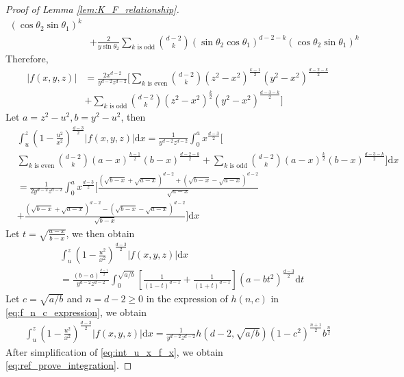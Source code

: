\documentclass[conference,a4paper]{IEEEtran}
\def\d{\mathrm{d}}
\begin{document}
\begin{proof}[Proof of Lemma \ref{lem:K_F_relationship}]
\begin{align*}
(\cos\theta_2 \sin\theta_1)^k \\
&+\frac{2}{y\sin\theta_2} \sum_{k \textrm{ is odd}}
\binom{d-2}{k} (\sin\theta_2\cos\theta_1)^{d-2-k}
(\cos\theta_2 \sin\theta_1)^k
\end{align*}
Therefore,
\begin{align*}
|f(x,y,z)|
&= \frac{2x^{d-2}}{y^{d-2}z^{d-2}}
\Big[
     \sum_{k \textrm{ is even}}
     \binom{d-2}{k} (z^2-x^2)^{\frac{k-1}{2}}
     (y^2-x^2)^{\frac{d-2-k}{2}}\\
    &+ \sum_{k \textrm{ is odd}}
    \binom{d-2}{k}    (z^2-x^2)^{\frac{k}{2}}
    (y^2-x^2)^{\frac{d-3-k}{2}}
\Big]
\end{align*}
Let $a=z^2-u^2, b=y^2-u^2$, then
\begin{align*}
     &\int_u^z (1-\frac{u^2}{x^2})^{\frac{d-3}{2}}
     |f(x,y,z)|\d x
     =\frac{1}{y^{d-2}z^{d-2}}
     \int_0^a x^{\frac{d-3}{2}}\Big[ \\
     &\sum_{k \textrm{ is even}}
     \binom{d-2}{k} (a-x)^{\frac{k-1}{2}}
     (b-x)^{\frac{d-2-k}{2}}
     + \sum_{k \textrm{ is odd}}
     \binom{d-2}{k} (a-x)^{\frac{k}{2}}
     (b-x)^{\frac{d-3-k}{2}}
     \Big]\d x\\
     &=\frac{1}{2y^{d-2}z^{d-2}}
     \int_0^a x^{\frac{d-3}{2}}\Big[\frac{(\sqrt{b-x} + \sqrt{a-x})^{d-2}+(\sqrt{b-x} - \sqrt{a-x})^{d-2}}{\sqrt{a-x}}\\
     &+\frac{(\sqrt{b-x} + \sqrt{a-x})^{d-2}-(\sqrt{b-x} - \sqrt{a-x})^{d-2}}{\sqrt{b-x}}\Big] \d x
\end{align*}
Let $t=\sqrt{\frac{a-x}{b-x}}$, we then obtain
\begin{align*}
     &\int_u^z (1-\frac{u^2}{x^2})^{\frac{d-3}{2}}
     |f(x,y,z)|\d x \\
     &=\frac{(b-a)^{\frac{d-1}{2}}}{y^{d-2}z^{d-2}}\int_0^{\sqrt{a/b}}
     \left[\frac{1}{(1-t)^{d-1}}+\frac{1}{(1+t)^{d-1}}\right](a-bt^2)^{\frac{d-3}{2}}\d t
\end{align*}
Let $c=\sqrt{a/b}$ and $n=d-2\geq 0$ in the expression of $h(n,c)$ in \eqref{eq:f_n_c_expression},
we obtain
\begin{align}\label{eq:int_u_x_f_x}
     \int_u^z (1-\frac{u^2}{x^2})^{\frac{d-3}{2}}
     |f(x,y,z)|\d x
     = \frac{1}{y^{d-2}z^{d-2}}h(d-2, \sqrt{a/b}) (1-c^2)^{\frac{n+1}{2}}b^{\frac{n}{2}}
\end{align}
After simplification of \eqref{eq:int_u_x_f_x}, we obtain \eqref{eq:ref_prove_integration}.
\end{proof}
\end{document}
